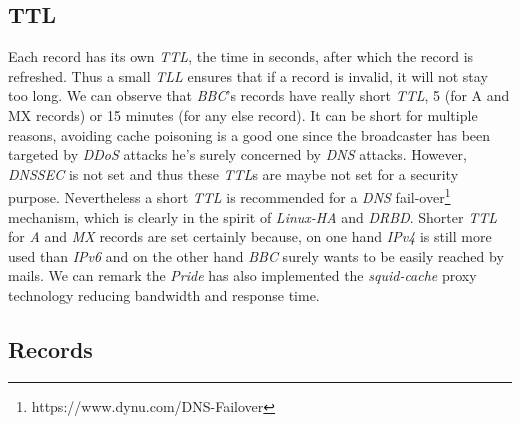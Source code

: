 \documentclass[conference]{IEEEtran}
\begin{document}
\subsection{TTL}
Each record has its own \textit{TTL}, the time in seconds, after which the record is refreshed. Thus a small \textit{TLL} ensures that if a record is invalid, it will not stay too long. We can observe that \textit{BBC}'s records have really short \textit{TTL}, 5 (for A and MX records) or 15 minutes (for any else record). It can be short for multiple reasons, avoiding cache poisoning is a good one since the broadcaster has been targeted by \textit{DDoS} attacks he's surely concerned by \textit{DNS} attacks. However, \textit{DNSSEC} is not set and thus these \textit{TTL}s are maybe not set for a security purpose. Nevertheless a short \textit{TTL} is recommended for a \textit{DNS} fail-over\footnote{https://www.dynu.com/DNS-Failover} mechanism, which is clearly in the spirit of \textit{Linux-HA} and \textit{DRBD}. Shorter \textit{TTL} for \textit{A} and \textit{MX} records are set certainly because, on one hand \textit{IPv4} is still more used than \textit{IPv6} and on the other hand \textit{BBC} surely wants to be easily reached by mails. We can remark the \textit{Pride} has also implemented the \textit{squid-cache} proxy technology reducing bandwidth and response time. 






\subsection{Records}
\end{document}
